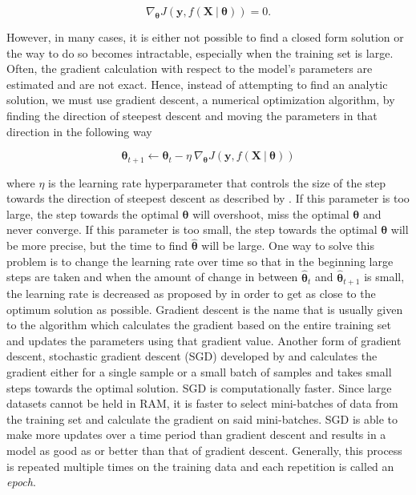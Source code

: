 \begin{equation}
	\nabla_{\boldsymbol{\theta}} J(\mathbf{y}, f(\mathbf{X} \ | \ \boldsymbol{\theta})) = 0.
\end{equation}

However, in many cases, it is either not possible to find a closed form solution or the way to do so becomes intractable, especially when the training set is large. Often, the gradient calculation with respect to the model's parameters are estimated and are not exact. Hence, instead of attempting to find an analytic solution, we must use gradient descent, a numerical optimization algorithm, by finding the direction of steepest descent and moving the parameters in that direction in the following way 

\begin{equation}
	\label{eq:sgd}
	\boldsymbol{\theta}_{t+1} \leftarrow \boldsymbol{\theta}_t - \eta \ \nabla_{\boldsymbol{\theta}} J(\mathbf{y}, f(\mathbf{X} \ | \ \boldsymbol{\theta})) 
\end{equation}

\noindent
where $\eta$ is the learning rate hyperparameter that controls the size of the step towards the direction of steepest descent as described by \citet{gd_explanation}. If this parameter is too large, the step towards the optimal $\boldsymbol{\theta}$ will overshoot, miss the optimal $\boldsymbol{\theta}$ and never converge. If this parameter is too small, the step towards the optimal $\boldsymbol{\theta}$ will be more precise, but the time to find $\boldsymbol{\hat{\theta}}$ will be large. One way to solve this problem is to change the learning rate over time so that in the beginning large steps are taken and when the amount of change in between $\boldsymbol{\hat{\theta}}_{t}$ and $\boldsymbol{\hat{\theta}}_{t+1}$ is small, the learning rate is decreased as proposed by \citet{decreasing_learning_rate} in order to get as close to the optimum solution as possible. Gradient descent is the name that is usually given to the algorithm which calculates the gradient based on the entire training set and updates the parameters using that gradient value. Another form of gradient descent, stochastic gradient descent (SGD) developed by \citet{sgd1} and \citet{sgd2}  calculates the gradient either for a single sample or a small batch of samples and takes small steps towards the optimal solution. SGD is computationally faster. Since large datasets cannot be held in RAM, it is faster to select mini-batches of data from the training set and calculate the gradient on said mini-batches. SGD is able to make more updates over a time period than gradient descent and results in a model as good as or better than that of gradient descent. Generally, this process is repeated multiple times on the training data and each repetition is called an \textit{epoch}.

